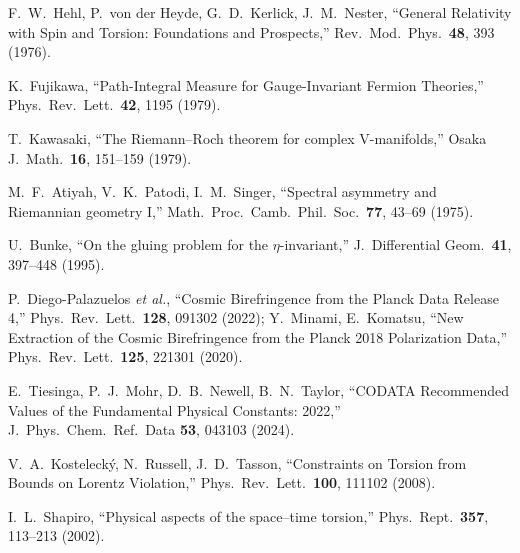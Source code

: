 \begin{enumerate}[label={[\arabic*]}]
    \item F.~W.~Hehl, P.~von der Heyde, G.~D.~Kerlick, J.~M.~Nester, 
        ``General Relativity with Spin and Torsion: Foundations and Prospects,'' 
        Rev.\ Mod.\ Phys.\ \textbf{48}, 393 (1976).
    
    \item K.~Fujikawa, ``Path-Integral Measure for Gauge-Invariant Fermion Theories,'' 
        Phys.\ Rev.\ Lett.\ \textbf{42}, 1195 (1979).
    
    \item T.~Kawasaki, ``The Riemann--Roch theorem for complex V-manifolds,'' 
        Osaka J.\ Math.\ \textbf{16}, 151--159 (1979).
    
    \item M.~F.~Atiyah, V.~K.~Patodi, I.~M.~Singer, 
        ``Spectral asymmetry and Riemannian geometry I,'' 
        Math.\ Proc.\ Camb.\ Phil.\ Soc.\ \textbf{77}, 43--69 (1975).
    
    \item U.~Bunke, ``On the gluing problem for the $\eta$-invariant,'' 
        J.\ Differential Geom.\ \textbf{41}, 397--448 (1995).
    
    \item P.~Diego-Palazuelos \textit{et al.}, 
        ``Cosmic Birefringence from the Planck Data Release 4,'' 
        Phys.\ Rev.\ Lett.\ \textbf{128}, 091302 (2022);
        Y.~Minami, E.~Komatsu, 
        ``New Extraction of the Cosmic Birefringence from the Planck 2018 Polarization Data,'' 
        Phys.\ Rev.\ Lett.\ \textbf{125}, 221301 (2020).
    
    \item E.~Tiesinga, P.~J.~Mohr, D.~B.~Newell, B.~N.~Taylor, 
        ``CODATA Recommended Values of the Fundamental Physical Constants: 2022,'' 
        J.\ Phys.\ Chem.\ Ref.\ Data \textbf{53}, 043103 (2024).
    
    \item V.~A.~Kosteleck\'y, N.~Russell, J.~D.~Tasson, 
        ``Constraints on Torsion from Bounds on Lorentz Violation,'' 
        Phys.\ Rev.\ Lett.\ \textbf{100}, 111102 (2008).
    
    \item I.~L.~Shapiro, ``Physical aspects of the space--time torsion,'' 
        Phys.\ Rept.\ \textbf{357}, 113--213 (2002).
\end{enumerate}


